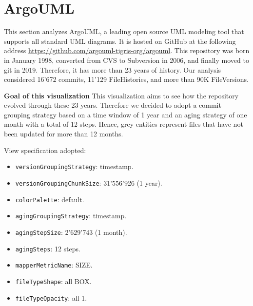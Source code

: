 \section{ArgoUML}
This section analyzes ArgoUML, a leading open source UML modeling tool that supports all standard UML diagrams. 
It is hosted on GitHub at the following address \url{https://github.com/argouml-tigris-org/argouml}. 
This repository was born in January 1998, converted from CVS to Subversion in 2006, and finally moved to git in 2019.
Therefore, it has more than 23 years of history. 
Our analysis considered 16'672 commits, 11'129 FileHistories, and more than 90K FileVersions. 

\label{subsec:view4}
\textbf{Goal of this visualization}
This visualization aims to see how the repository evolved through these 23 years. Therefore we decided to adopt a commit grouping strategy based on a time window of 1 year and an aging strategy of one month with a total of 12 steps. Hence, grey entities represent files that have not been updated for more than 12 months. 


View specification adopted: 
\begin{itemize}
    \item \texttt{versionGroupingStrategy}: timestamp.
    \item \texttt{versionGroupingChunkSize}: 31'556'926 (1 year). 
    \item \texttt{colorPalette}: default.
    \item \texttt{agingGroupingStrategy}: timestamp.
    \item \texttt{agingStepSize}: 2'629'743 (1 month).
    \item \texttt{agingSteps}: 12 steps.
    \item \texttt{mapperMetricName}: SIZE. 
    \item \texttt{fileTypeShape}: all BOX. 
    \item \texttt{fileTypeOpacity}: all 1. 
\end{itemize}

